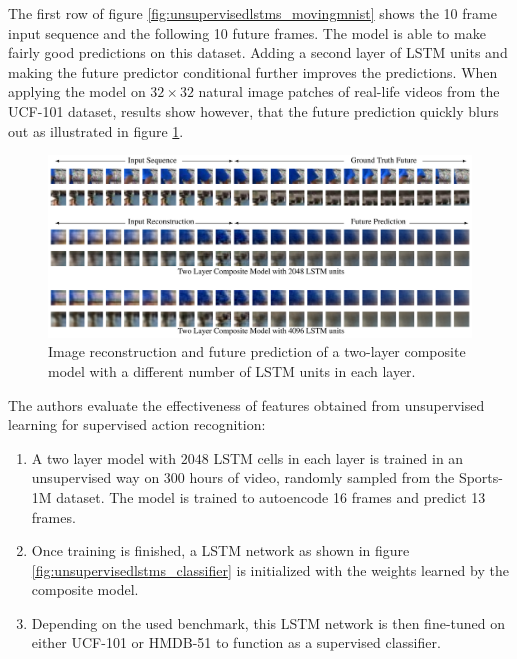 The first row of figure \ref{fig:unsupervisedlstms_movingmnist} shows the 10 frame input sequence and the following 10 future frames.
The model is able to make fairly good predictions on this dataset.
Adding a second layer of LSTM units and making the future predictor conditional further improves the predictions.
When applying the model on $32 \times 32$ natural image patches of real-life videos from the UCF-101 dataset, results show however, that the future prediction quickly blurs out as illustrated in figure \ref{fig:unsupervisedlstms_ucfpatches}.

\begin{figure}[H]
    \centering
    \includegraphics[width=\textwidth]{img_deep/unsupervisedlstms_ucfpatches.png}
    \caption{Image reconstruction and future prediction of a two-layer composite model with a different number of LSTM units in each layer. \cite{srivastava_unsupervised_2015}}
    \label{fig:unsupervisedlstms_ucfpatches}
\end{figure}

The authors evaluate the effectiveness of features obtained from unsupervised learning for supervised action recognition:

\begin{enumerate}
    \item A two layer model with $2048$ LSTM cells in each layer is trained in an unsupervised way on 300 hours of video, randomly sampled from the Sports-1M dataset.
        The model is trained to autoencode 16 frames and predict 13 frames.
    \item Once training is finished, a LSTM network as shown in figure \ref{fig:unsupervisedlstms_classifier} is initialized with the weights learned by the composite model.
    \item Depending on the used benchmark, this LSTM network is then fine-tuned on either UCF-101 or HMDB-51 to function as a supervised classifier.
\end{enumerate}

